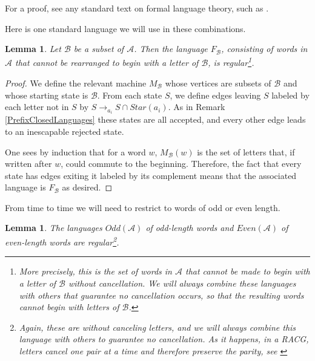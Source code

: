 \documentclass[10pt,a4paper]{amsart}
\newtheorem{lemma}[theorem]{Lemma}
\theoremstyle{definition}
\theoremstyle{remark}
\begin{document}
	For a proof, see any standard text on formal language theory, such as \cite{WordProcessing}.
	
	Here is one standard language we will use in these combinations.
	
	\begin{lemma}
		
		Let $\mathscr{B}$ be a subset of $\mathscr{A}$. Then the language $F_\mathscr{B}$, consisting of words in $\mathscr{A}$ that cannot be rearranged to begin with a letter of $\mathscr{B}$, is regular\footnote{More precisely, this is the set of words in $\mathscr{A}$ that cannot be made to begin with a letter of $\mathscr{B}$ without cancellation. We will always combine these languages with others that guarantee no cancellation occurs, so that the resulting words cannot begin with letters of $\mathscr{B}$.}.
		
	\end{lemma}
	
	\begin{proof}
		
		We define the relevant machine $M_\mathscr{B}$ whose vertices are subsets of $\mathscr{B}$ and whose starting state is $\mathscr{B}$. From each state $S$, we define edges leaving $S$ labeled by each letter not in $S$ by $S\to_{a_i} S\cap Star(a_i)$. As in Remark \ref{PrefixClosedLanguages} these states are all accepted, and every other edge leads to an inescapable rejected state.
		
		One sees by induction that for a word $w$, $M_{\mathscr{B}}(w)$ is the set of letters that, if written after $w$, could commute to the beginning. Therefore, the fact that every state has edges exiting it labeled by its complement means that the associated language is $F_{\mathscr{B}}$ as desired.
	\end{proof}
	
	From time to time we will need to restrict to words of odd or even length.
	
	\begin{lemma}
		
		The languages $Odd(\mathscr{A})$ of odd-length words and $Even(\mathscr{A})$ of even-length words are regular\footnote{Again, these are without canceling letters, and we will always combine this language with others to guarantee no cancellation. As it happens, in a RACG, letters cancel one pair at a time and therefore preserve the parity, see \cite{Davis}}.
		
	\end{lemma}
	
\end{document}
